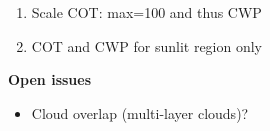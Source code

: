 \begin{enumerate}[label=(\alph*)]
 \item\label{it:scaleCOT} Scale COT: max=100 and thus CWP

 \item\label{it:sunlitCOT} COT and CWP for sunlit region only

\color{black}

\end{enumerate}


\textbf{Open issues}
\begin{itemize}
\item Cloud overlap (multi-layer clouds)?
\end{itemize}
